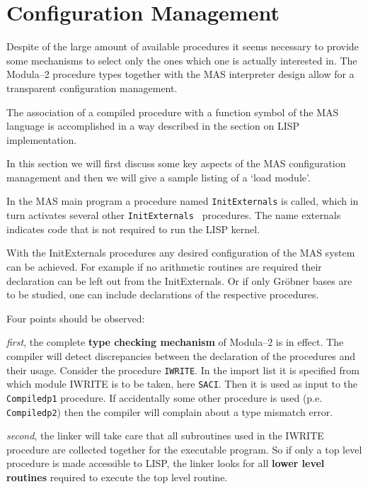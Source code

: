 \section{Configuration Management}

Despite of the large amount of available procedures
it seems necessary to provide some mechanisms
to select only the ones which one is actually interested in.
The Modula--2 procedure types together with 
the MAS interpreter design allow for a transparent 
configuration management.

The association of a compiled procedure with 
a function symbol of the MAS language is accomplished
in a way described in the section on LISP implementation.

In this section we will first discuss some 
key aspects of the MAS configuration management and then
we will give a sample listing of a `load module'.

In the MAS main program a procedure named 
\verb/InitExternals/ is called, which in turn activates
several other \verb*/InitExternals / procedures.
The name externals indicates code that is not required to run
the LISP kernel. 

With the InitExternals procedures any desired configuration 
of the MAS system can be achieved. For example
if no arithmetic routines are required 
their declaration can be left out from the InitExternals.
Or if only Gr\"obner bases are to be studied, one 
can include declarations of the respective procedures.

Four points should be observed:

{\em first}, the complete {\bf type checking mechanism} of Modula--2
is in effect. The compiler will detect discrepancies
between the declaration of the procedures and their usage.
Consider the procedure \verb/IWRITE/. 
In the import list it is specified from which 
module IWRITE is to be taken, here \verb/SACI/.  
Then it is used as input to the 
\verb/Compiledp1/ procedure. If accidentally some other
procedure is used (p.e. \verb/Compiledp2/) then the 
compiler will complain about a type mismatch error. 

{\em second}, the linker will take care that all 
subroutines used in the IWRITE procedure are 
collected together for the executable program. 
So if only a top level procedure is made accessible to
LISP, the linker looks for all {\bf lower level routines}
required to execute the top level routine.

